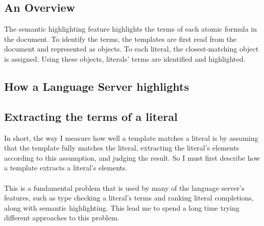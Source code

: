 \documentclass[../main.tex]{subfiles}
\begin{document}
\subsection{An Overview}
The semantic highlighting feature highlights the terms of each atomic formula in the document. To identify the terms, the templates are first read from the document and represented as  objects. To each literal, the closest-matching  object is assigned. Using these  objects, literals' terms are identified and highlighted.

\subsection{How a Language Server highlights}


\subsection{Extracting the terms of a literal}
In short, the way I measure how well a template matches a literal is by assuming that the template fully matches the literal, extracting the literal's elements according to this assumption, and judging the result. So I must first describe how a template extracts a literal's elements.
\\ 
\\
This is a fundamental problem that is used by many of the language server's features, such as type checking a literal's terms and ranking literal completions, along with semantic highlighting. This lead me to spend a long time trying different approaches to this problem.
\end{document}
